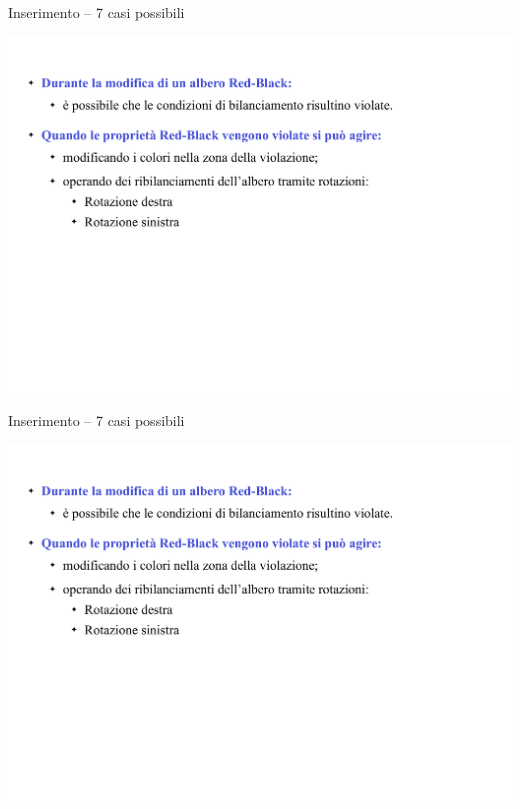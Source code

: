 \begin{frame}{Inserimento -- 7 casi possibili}

\includegraphics[width=1.0\textwidth,page=15]{redblack2.pdf}

\end{frame}

\begin{frame}{Inserimento -- 7 casi possibili}

\includegraphics[width=1.0\textwidth,page=16]{redblack2.pdf}

\end{frame}

